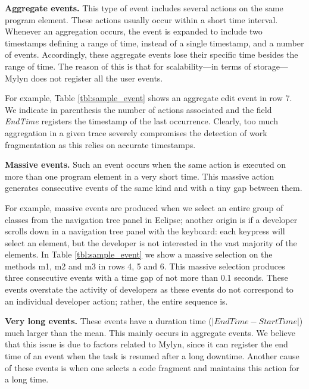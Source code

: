 \documentclass[times]{smrauth}
\newcommand\RR[1]{\textbf{Romain #1}}
\begin{document}
\textbf{Aggregate events. } This type of event includes several actions on the same program element. These actions usually occur within a short time interval.  Whenever an aggregation occurs, the event is expanded to include two timestamps defining a range of time, instead of a single timestamp, and a number of events. Accordingly, these aggregate events lose their specific time besides the range of time. The reason of this is that for scalability---in terms of storage---Mylyn does not register all the user events.

For example, Table \ref{tbl:sample_event} shows an aggregate edit event in row 7. We indicate in parenthesis the number of actions associated and the field \textit{EndTime} registers the timestamp of the last occurrence. Clearly, too much aggregation in a given trace severely compromises the detection of work fragmentation as this relies on accurate timestamps.


\textbf{Massive events. } Such an event occurs when the same action is executed on more than one program element in a very short time. This massive action generates consecutive events of the same kind and with a tiny gap between them.

For example, massive events are produced when we select an entire group of classes from the navigation tree panel in Eclipse; another origin is if a developer scrolls down in a navigation tree panel with the keyboard: each keypress will select an element, but the developer is not interested in the vast majority of the elements. In  Table \ref{tbl:sample_event} we show a massive selection on the methods m1, m2 and m3  in rows 4, 5 and 6. This massive selection produces three consecutive events with a time gap of not more than 0.1 seconds. These events overstate the activity of developers as these events do not correspond to an individual developer action; rather, the entire sequence is.


\textbf{Very long events. } These events have a duration time ($|EndTime - StartTime|$) much larger than the mean. This mainly occurs in aggregate events. We believe that this issue is due to factors related to Mylyn, since it can register the end time of an event when the task is resumed after a long downtime. Another cause of these events is when one selects a code fragment and maintains this action for a long time. 
 
\end{document}
